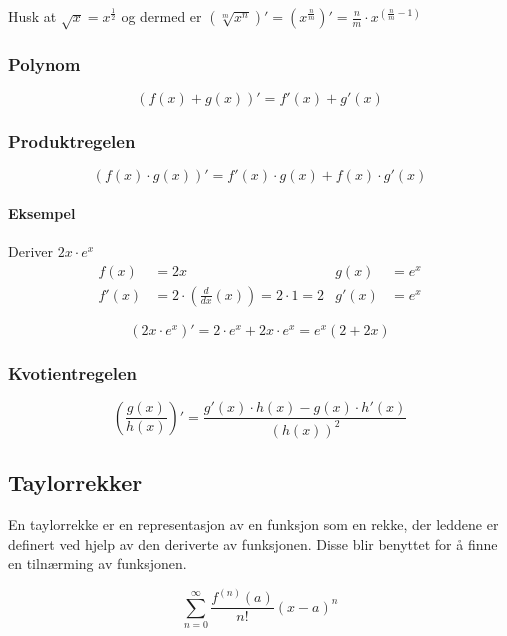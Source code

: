\documentclass[12pt,norsk,a4paper]{article}
\begin{document}
Husk at $\sqrt{x} = x^{\frac{1}{2}}$ og dermed er $(\sqrt[m]{x^{n}})' = (x^{\frac{n}{m}})' = \frac{n}{m} \cdot x ^{(\frac{n}{m} - 1)}  $

\subsubsection*{Polynom}
\begin{equation}
(f(x) + g(x))' = f'(x) + g'(x)
\end{equation}

\subsubsection*{Produktregelen}
\begin{equation}
(f(x) \cdot g(x))' = f'(x) \cdot g(x) + f(x) \cdot g'(x)
\end{equation}

\paragraph*{Eksempel} Deriver $2x \cdot e^{x}$
\begin{align*}
f(x) &= 2x		&	g(x) &= e^{x}		\\
f'(x) &= 2 \cdot (\frac{d}{dx}(x)) = 2 \cdot 1 = 2 		&	g'(x) &= e^{x}
\end{align*}

\begin{equation*}
(2x \cdot e^{x})' = 2 \cdot e^{x} + 2x \cdot e^{x} = e^{x} (2 + 2x)
\end{equation*}

\subsubsection*{Kvotientregelen}
\begin{equation}
(\frac{g(x)}{h(x)})' = \frac{g'(x) \cdot h(x) - g(x) \cdot h'(x)}{(h(x))^{2}}
\end{equation}

\newpage

\subsection{Taylorrekker}
En taylorrekke er en representasjon av en funksjon som en rekke, der leddene er definert ved hjelp av den deriverte av funksjonen. Disse blir benyttet for å finne en tilnærming av funksjonen.

\begin{equation}
\sum\limits_{n=0}^{\infty} \frac{f^{(n)}(a)}{n!}(x - a)^{n} 
\end{equation}
\end{document}
